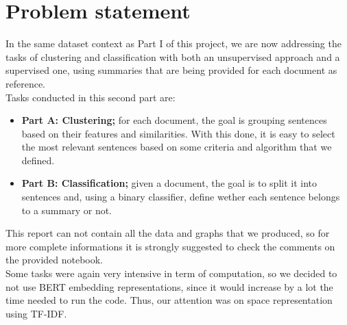 \section{Problem statement}
In the same dataset context as Part I of this project, we are now addressing the tasks of clustering and classification with both an unsupervised approach and a supervised one, using summaries that are being provided for each document as reference.\\
Tasks conducted in this second part are:
\begin{itemize}
    \item \textbf{Part A: Clustering;} for each document, the goal is grouping sentences based on their features and similarities. With this done, it is easy to select the most relevant sentences based on some criteria and algorithm that we defined.
    \item \textbf{Part B: Classification;} given a document, the goal is to split it into sentences and, using a binary classifier, define wether each sentence belongs to a summary or not. 
\end{itemize}
This report can not contain all the data and graphs that we produced, so for more complete informations it is strongly suggested to check the comments on the provided notebook. \\
Some tasks were again very intensive in term of computation, so we decided to not use BERT embedding representations, since it would increase by a lot the time needed to run the code. Thus, our attention was on space representation using TF-IDF.
